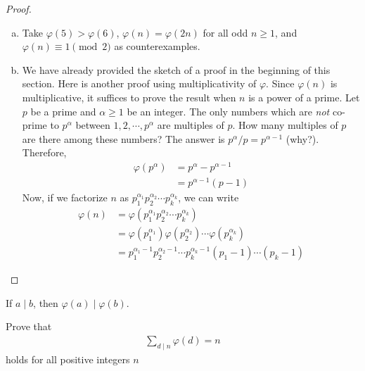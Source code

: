 \begin{proof}
\begin{enumerate}[(a)]
			\item Take $\varphi(5)>\varphi(6)$, $\varphi(n)=\varphi(2n)$ for all odd $n\geq 1$, and $\varphi(n) \equiv 1 \pmod 2$ as counterexamples.

			\item We have already provided the sketch of a proof in the beginning of this section. Here is another proof using multiplicativity of $\varphi$. Since $\varphi(n)$ is multiplicative, it suffices to prove the result when $n$ is a power of a prime. Let $p$ be a prime and $\alpha \geq 1$ be an integer. The only numbers which are \textit{not} co-prime to $p^\alpha$ between $1,2,\cdots,p^\alpha$ are multiples of $p$. How many multiples of $p$ are there among these numbers? The answer is $p^\alpha/p=p^{\alpha-1}$ (why?). Therefore,
				\begin{align*}
					\varphi(p^\alpha) &= p^\alpha - p^{\alpha -1}\\
					&= p^{\alpha -1} (p-1)
				\end{align*}
			Now, if we factorize $n$ as $p_1^{\alpha_1} p_2^{\alpha_2} \cdots p_k^{\alpha_k}$, we can write
				\begin{align*}
					\varphi(n) & = \varphi(p_1^{\alpha_1} p_2^{\alpha_2} \cdots p_k^{\alpha_k})\\
				   & = \varphi(p_1^{\alpha_1}) \varphi(p_2^{\alpha_2}) \cdots \varphi(p_k^{\alpha_k})\\
				   & = p_1^{\alpha_1-1} p_2^{\alpha_2-1} \cdots p_k^{\alpha_k-1} \left( p_1 -1 \right) \cdots \left( p_k -1 \right)
				\end{align*}
		\end{enumerate}
	\end{proof}

	\begin{corollary}\label{cor:phidiv}
		If $a\mid b$, then $\varphi(a)\mid \varphi(b)$.
	\end{corollary}

	\begin{theorem}\label{thm:phi*1}
		Prove that
			\begin{align*}
				\sum_{d\mid n} \varphi(d)=n
			\end{align*}
		holds for all positive integers $n$
	\end{theorem}

